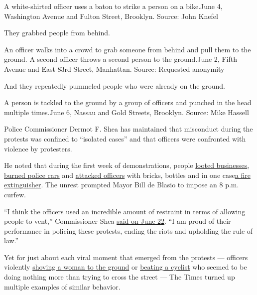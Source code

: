 A white-shirted officer uses a baton to strike a person on a bike.June
4, Washington Avenue and Fulton Street, Brooklyn. Source: John Knefel

They grabbed people from behind.

An officer walks into a crowd to grab someone from behind and pull them
to the ground. A second officer throws a second person to the
ground.June 2, Fifth Avenue and East 83rd Street, Manhattan. Source:
Requested anonymity

And they repeatedly pummeled people who were already on the ground.

A person is tackled to the ground by a group of officers and punched in
the head multiple times.June 6, Nassau and Gold Streets, Brooklyn.
Source: Mike Hassell

Police Commissioner Dermot F. Shea has maintained that misconduct during
the protests was confined to ``isolated cases'' and that officers were
confronted with violence by protesters.

He noted that during the first week of demonstrations, people
\href{https://www.nytimes3xbfgragh.onion/2020/05/31/nyregion/nyc-protests-george-floyd.html}{looted
businesses},
\href{https://www.nytimes3xbfgragh.onion/2020/05/31/nyregion/police-cars-nyc-protests.html}{burned
police cars} and
\href{https://www.nytimes3xbfgragh.onion/2020/05/30/nyregion/nyc-protests-george-floyd.html}{attacked
officers} with bricks, bottles and in one
case\href{https://nypost.com/2020/06/03/nypd-cop-bashed-with-fire-extinguisher-during-mayhem-in-manhattan/}{}\href{https://nypost.com/2020/06/03/nypd-cop-bashed-with-fire-extinguisher-during-mayhem-in-manhattan/}{a
fire extinguisher}. The unrest prompted Mayor Bill de Blasio to impose
an 8 p.m. curfew.

``I think the officers used an incredible amount of restraint in terms
of allowing people to vent,'' Commissioner Shea
\href{https://ag.ny.gov/NYPDtestimony}{said on June 22}. ``I am proud of
their performance in policing these protests, ending the riots and
upholding the rule of law.''

Yet for just about each viral moment that emerged from the protests ---
officers violently
\href{https://twitter.com/whitney_hu/status/1266540710188195843}{shoving
a woman to the ground} or
\href{https://twitter.com/joshfoxfilm/status/1268366550475603969}{beating
a cyclist} who seemed to be doing nothing more than trying to cross the
street --- The Times turned up multiple examples of similar behavior.

